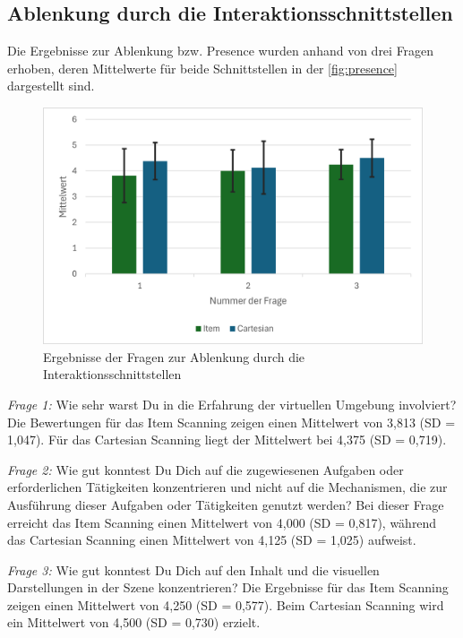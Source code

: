 \subsection{Ablenkung durch die Interaktionsschnittstellen}

Die Ergebnisse zur Ablenkung bzw. Presence wurden anhand von drei Fragen erhoben, deren Mittelwerte für beide Schnittstellen in der \autoref{fig:presence} dargestellt sind.

\begin{figure}[tbh]
    \centering
    \includegraphics{images/Results/Fragen-zur-Presence-Ablenkung.png}
    \caption{Ergebnisse der Fragen zur Ablenkung durch die Interaktionsschnittstellen}
    \label{fig:presence}
\end{figure}

\textit{Frage 1:} Wie sehr warst Du in die Erfahrung der virtuellen Umgebung involviert?
Die Bewertungen für das Item Scanning zeigen einen Mittelwert von 3,813 (SD = 1,047). Für das Cartesian Scanning liegt der Mittelwert bei 4,375 (SD = 0,719).

\textit{Frage 2:} Wie gut konntest Du Dich auf die zugewiesenen Aufgaben oder erforderlichen Tätigkeiten konzentrieren und nicht auf die Mechanismen, die zur Ausführung dieser Aufgaben oder Tätigkeiten genutzt werden?
Bei dieser Frage erreicht das Item Scanning einen Mittelwert von 4,000 (SD = 0,817), während das Cartesian Scanning einen Mittelwert von 4,125 (SD = 1,025) aufweist.

\textit{Frage 3:} Wie gut konntest Du Dich auf den Inhalt und die visuellen Darstellungen in der Szene konzentrieren?
Die Ergebnisse für das Item Scanning zeigen einen Mittelwert von 4,250 (SD = 0,577). Beim Cartesian Scanning wird ein Mittelwert von 4,500 (SD = 0,730) erzielt.

